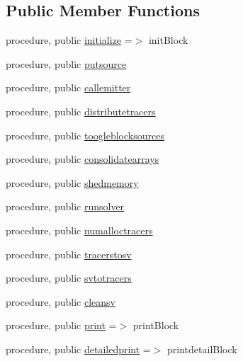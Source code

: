 \subsection*{Public Member Functions}
\begin{DoxyCompactItemize}
\item 
procedure, public \mbox{\hyperlink{structblocks__mod_1_1block__class_ad671745ca5dc3227ddb0ed1d9ff45268}{initialize}} =$>$ init\+Block
\item 
procedure, public \mbox{\hyperlink{structblocks__mod_1_1block__class_ac79980e841902691a06212dce50f6331}{putsource}}
\item 
procedure, public \mbox{\hyperlink{structblocks__mod_1_1block__class_ad1d0f1aca1323fad86177deb0b818a51}{callemitter}}
\item 
procedure, public \mbox{\hyperlink{structblocks__mod_1_1block__class_a00f8c114e84499356db3f8b633a6b3a3}{distributetracers}}
\item 
procedure, public \mbox{\hyperlink{structblocks__mod_1_1block__class_a73bd9f99f97d7fd882a3ade1103d27ae}{toogleblocksources}}
\item 
procedure, public \mbox{\hyperlink{structblocks__mod_1_1block__class_a68f5bb0cb32b5b51cffd66d472cc45f0}{consolidatearrays}}
\item 
procedure, public \mbox{\hyperlink{structblocks__mod_1_1block__class_a2e0c6452c90707a798ba55efaba43121}{shedmemory}}
\item 
procedure, public \mbox{\hyperlink{structblocks__mod_1_1block__class_abe738c65f3fecf013c3884275a3fe7e4}{runsolver}}
\item 
procedure, public \mbox{\hyperlink{structblocks__mod_1_1block__class_a7a3f2eb6823a683a6aaa2159b50ee990}{numalloctracers}}
\item 
procedure, public \mbox{\hyperlink{structblocks__mod_1_1block__class_a5a0ac8b8f2440af5e52a7c4bc59be470}{tracerstosv}}
\item 
procedure, public \mbox{\hyperlink{structblocks__mod_1_1block__class_a5f32bf4e17b571024c594cb4866513ee}{svtotracers}}
\item 
procedure, public \mbox{\hyperlink{structblocks__mod_1_1block__class_a17439a0d58c047428bee213d2a7b4bd5}{cleansv}}
\item 
procedure, public \mbox{\hyperlink{structblocks__mod_1_1block__class_a43b4c133934eaadb55d30cf834d1e28c}{print}} =$>$ print\+Block
\item 
procedure, public \mbox{\hyperlink{structblocks__mod_1_1block__class_a937d8dca8393460bc718dafa8a5c03ac}{detailedprint}} =$>$ printdetail\+Block
\end{DoxyCompactItemize}
